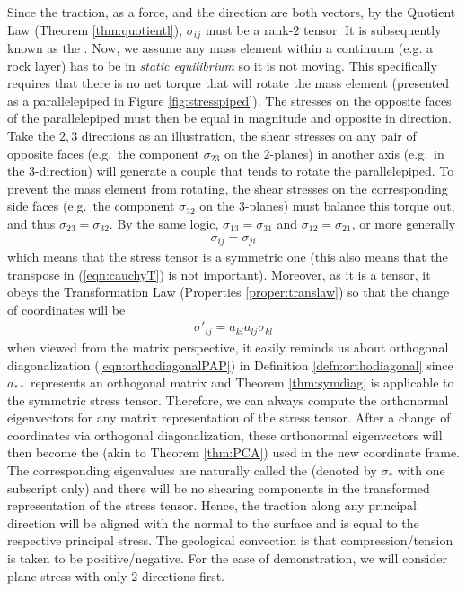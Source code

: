 Since the traction, as a force, and the direction are both vectors, by the Quotient Law (Theorem \ref{thm:quotientl}), $\sigma_{ij}$ must be a rank-$2$ tensor. It is subsequently known as the . Now, we assume any mass element within a continuum (e.g. a rock layer) has to be in \textit{static equilibrium} so it is not moving. This specifically requires that there is no net torque that will rotate the mass element (presented as a parallelepiped in Figure \ref{fig:stresspiped}). The stresses on the opposite faces of the parallelepiped must then be equal in magnitude and opposite in direction. Take the $2,3$ directions as an illustration, the shear stresses on any pair of opposite faces (e.g.\ the component $\sigma_{23}$ on the $2$-planes) in another axis (e.g.\ in the $3$-direction) will generate a couple that tends to rotate the parallelepiped. To prevent the mass element from rotating, the shear stresses on the corresponding side faces (e.g.\ the component $\sigma_{32}$ on the $3$-planes) must balance this torque out, and thus $\sigma_{23} = \sigma_{32}$. By the same logic, $\sigma_{13} = \sigma_{31}$ and $\sigma_{12} = \sigma_{21}$, or more generally
\begin{align}
\sigma_{ij} = \sigma_{ji}
\end{align}
which means that the stress tensor is a symmetric one (this also means that the transpose in (\ref{eqn:cauchyT}) is not important). Moreover, as it is a tensor, it obeys the Transformation Law (Properties \ref{proper:translaw}) so that the change of coordinates will be
\begin{align}
\sigma'_{ij} = a_{ki}a_{lj}\sigma_{kl}
\end{align}
when viewed from the matrix perspective, it easily reminds us about orthogonal diagonalization (\ref{eqn:orthodiagonalPAP}) in Definition \ref{defn:orthodiagonal} since $a_{**}$ represents an orthogonal matrix and Theorem \ref{thm:symdiag} is applicable to the symmetric stress tensor. Therefore, we can always compute the orthonormal eigenvectors for any matrix representation of the stress tensor. After a change of coordinates via orthogonal diagonalization, these orthonormal eigenvectors will then become the  (akin to Theorem \ref{thm:PCA}) used in the new coordinate frame. The corresponding eigenvalues are naturally called the  (denoted by $\sigma_{*}$ with one subscript only) and there will be no shearing components in the transformed representation of the stress tensor. Hence, the traction along any principal direction will be aligned with the normal to the surface and is equal to the respective principal stress. The geological convection is that compression/tension is taken to be positive/negative. For the ease of demonstration, we will consider plane stress with only $2$ directions first.

